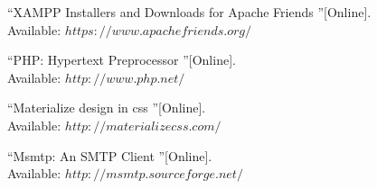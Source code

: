\documentclass[11pt]{report}
\begin{document}
\begin{thebibliography}{}


 \textquotedblleft XAMPP Installers and Downloads for Apache Friends \textquotedblright[Online].\\ 
Available: $https://www.apachefriends.org/$

 \textquotedblleft PHP: Hypertext Preprocessor \textquotedblright[Online].\\ 
Available: $http://www.php.net/$

 \textquotedblleft Materialize design in css \textquotedblright [Online].\\
Available: $http://materializecss.com/$

 \textquotedblleft Msmtp: An SMTP Client \textquotedblright [Online].\\
Available: $http://msmtp.sourceforge.net/$

\end{thebibliography}
\end{document}
